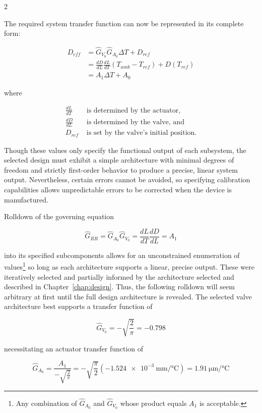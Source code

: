 \documentclass[12pt, letterpaper]{report}%
\newcounter{mycounter}           %
\newcounter{sub}[mycounter]      %
\newcommand{\AoneExact}{\SI{-1.524e-3}{\milli\meter\per\celsius}}
\newcommand{\GA}{\SI{1.91}{\micro\meter\per\celsius}}
\newcommand{\GV}{\num{-0.798}}
\newcommand{\RRfull}
{
	\begin{equation}
		\begin{aligned}
			D_{eff} &= \hat{G}_{V_0} \hat{G}_{A_0} \Delta T + D_{ref} \\
			&= \frac{dD}{dL} \frac{dL}{dT} (T_{amb} - T_{ref}) + D(T_{ref}) \\
			&= A_1 \Delta T + A_0
		\end{aligned}
	\end{equation}
}
\begin{document}
\begin{multicols}{2}
{					The required system transfer function can now be represented in its complete form:
					\RRfull

					\quad where

					\setlength{\jot}{2pt}

					\begin{align*}
						\frac{dL}{dT} &\text{ is determined by the actuator,} \\[6pt]
						\frac{dD}{dL} &\text{ is determined by the valve, and} \\[6pt]
						D_{ref} &\text{ is set by the valve's initial position.}
					\end{align*}
				}

			\end{multicols}

			Though these values only specify the functional output of each subsystem, the selected design must exhibit a simple architecture with minimal degrees of freedom and strictly first-order behavior
			to produce a precise, linear system output. Nevertheless, certain errors cannot be avoided, so specifying calibration capabilities allows unpredictable errors to be corrected when
			the device is manufactured.

			Rolldown of the governing equation

			\begin{equation}
				\hat{G}_{RR} = \hat{G}_{A_0} \hat{G}_{V_0} = \frac{dL}{dT} \frac{dD}{dL} = A_1
			\end{equation}

			into its specified subcomponents allows for an unconstrained enumeration of values\footnote{
				Any combination of $\hat{G}_{A_0}$ and $\hat{G}_{V_0}$ whose product equals $A_1$ is acceptable.
			} so long as each architecture supports a linear, precise output.
			These were iteratively selected and partially informed by the architecture selected and described in Chapter~\ref{chap:design}.
			Thus, the following rolldown will seem arbitrary at first until the full design architecture is revealed. The selected valve architecture best supports a transfer function of

			\begin{equation}
				\hat{G}_{V_0} = - \sqrt{\frac{2}{\pi}} = \GV
			\end{equation}

			necessitating an actuator transfer function of

			\begin{equation}
				\hat{G}_{A_0} = \frac{A_1}{- \sqrt{\frac{2}{\pi}}} = - \sqrt{\frac{\pi}{2}} (\AoneExact) = \GA
			\end{equation}
\end{document}
